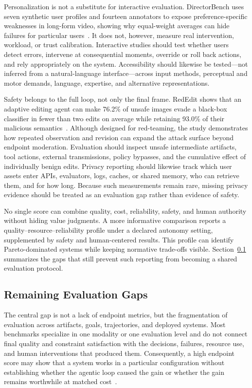 Personalization is not a substitute for interactive evaluation. DirectorBench uses seven synthetic user profiles and fourteen annotators to expose preference-specific weaknesses in long-form video, showing why equal-weight averages can hide failures for particular users~\cite{avg260530090}. It does not, however, measure real intervention, workload, or trust calibration. Interactive studies should test whether users detect errors, intervene at consequential moments, override or roll back actions, and rely appropriately on the system. Accessibility should likewise be tested---not inferred from a natural-language interface---across input methods, perceptual and motor demands, language, expertise, and alternative representations.

Safety belongs to the full loop, not only the final frame. RedEdit shows that an adaptive editing agent can make 76.2\% of unsafe images evade a black-box classifier in fewer than two edits on average while retaining 93.0\% of their malicious semantics~\cite{avg260606140}. Although designed for red-teaming, the study demonstrates how repeated observation and revision can expand the attack surface beyond endpoint moderation. Evaluation should inspect unsafe intermediate artifacts, tool actions, external transmissions, policy bypasses, and the cumulative effect of individually benign edits. Privacy reporting should likewise track which user assets enter APIs, evaluators, logs, caches, or shared memory, who can retrieve them, and for how long. Because such measurements remain rare, missing privacy evidence should be treated as an evaluation gap rather than evidence of safety.

No single score can combine quality, cost, reliability, safety, and human authority without hiding value judgments. A more informative comparison reports a quality--resource--reliability profile under a declared autonomy setting, supplemented by safety and human-centered results. This profile can identify Pareto-dominated systems while keeping normative trade-offs visible. Section~\ref{subsec:evaluation-gaps} summarizes the gaps that still prevent such reporting from becoming a shared evaluation protocol.

\subsection{Remaining Evaluation Gaps}
\label{subsec:evaluation-gaps}

The central gap is not a lack of endpoint metrics, but the fragmentation of evaluation across artifacts, goals, trajectories, and deployed systems. Most benchmarks specialize in one modality or one evaluation level and do not connect final quality and constraint satisfaction with the decisions, failures, resource use, and human interventions that produced them. Consequently, a high endpoint score may show that a system works in a particular configuration without establishing whether the agentic loop caused the gain or whether the gain remains worthwhile at matched cost~\cite{avg250913399,avg260601057,avg260526144,avg260608091}.

